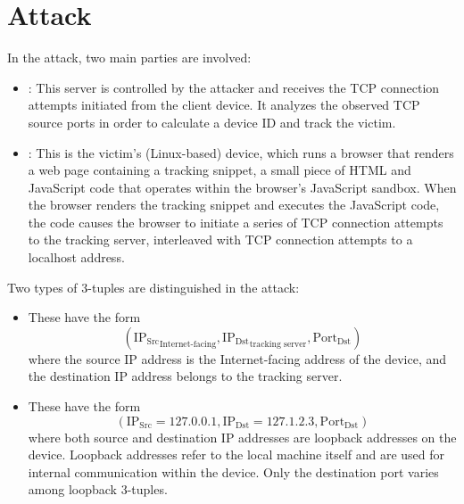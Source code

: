 \documentclass[twocolumn]{report}
\begin{document}
\section{Attack}
\label{sec:attack}

In the attack, two main parties are involved:

\begin{itemize}
	\item {}: This server is controlled by the \alert{attacker} and receives the TCP connection attempts initiated from the client device. It analyzes the observed TCP source ports in order to calculate a device ID and track the victim.%

	\item {}: This is the \alert{victim’s} (Linux-based) device, which runs a browser that renders a web page containing a \alert{tracking snippet}, a small piece of HTML and JavaScript code that operates within the browser’s JavaScript sandbox. When the browser renders the tracking snippet and executes the JavaScript code, the code causes the browser to initiate a series of TCP connection attempts to the \alert{tracking server}, interleaved with TCP connection attempts to a \alert{localhost address}.
\end{itemize}

Two \alert{types of 3-tuples} are distinguished in the attack:

\begin{itemize}
	\item {} These have the form
	\begin{equation*}
		(\mathrm{IP_{Src}}_{\text{Internet-facing}}, \mathrm{IP_{Dst}}_{\text{tracking server}}, \mathrm{Port_{Dst}})
	\end{equation*}
	where the source IP address is the Internet-facing address of the device, and the destination IP address belongs to the tracking server.

	\item {} These have the form
	\begin{equation*}
		(\mathrm{IP_{Src}} = 127.0.0.1, \mathrm{IP_{Dst}} = 127.1.2.3, \mathrm{Port_{Dst}})
	\end{equation*}
	where both source and destination IP addresses are loopback addresses on the device. \alert{Loopback addresses} refer to the local machine itself and are used for internal communication within the device. Only the \alert{destination port} varies among loopback 3-tuples.
\end{itemize}
\end{document}
